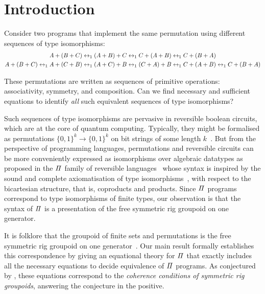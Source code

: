 \section{Introduction}
\label{sec:introduction}

Consider two programs that implement the same permutation using different sequences of type isomorphisms:
\begin{align*}
      A + (B + C) \leftrightarrow_1
      (A + B) + C & \leftrightarrow_1
      C + (A + B) \leftrightarrow_1
      C + (B + A)
      \\
      A + (B + C) \leftrightarrow_1
      A + (C + B) \leftrightarrow_1
      (A + C) + B & \leftrightarrow_1
      (C + A) + B \leftrightarrow_1
      C + (A + B) \leftrightarrow_1
      C + (B + A)
\end{align*}

\noindent These permutations are written as sequences of primitive operations: associativity, symmetry, and
composition. Can we find necessary and sufficient equations to identify \emph{all} such equivalent sequences of type
isomorphisms?

Such sequences of type isomorphisms are pervasive in reversible boolean circuits, which are at the core of quantum
computing. Typically, they might be formalised as permutations $\{0,1\}^k \to \{0,1\}^k$ on bit strings of some length
$k$~\cite{aaronson_et_al:LIPIcs:2017:8173,1201583}. But from the perspective of programming languages, permutations and
reversible circuits can be more conveniently expressed as isomorphisms over algebraic datatypes as proposed in the
$\mathit{\Pi}$ family of reversible languages~\cite*{jamesInformationEffects2012,theseus} whose syntax is inspired by the
sound and complete axiomatisation of type isomorphisms~\cite{fioreRemarksIsomorphismsTyped2002}, with respect to the
bicartesian structure, that is, coproducts and products. Since $\mathit{\Pi}$ programs correspond to type isomorphisms of
finite types, our observation is that the syntax of $\mathit{\Pi}$ is a presentation of the free symmetric rig groupoid on
one generator.

It is folklore that the groupoid of finite sets and permutations is the free symmetric rig groupoid on one
generator~\cite{laplaza72,kelly74,baez2000finite}. Our main result formally establishes this correspondence by giving an
equational theory for $\mathit{\Pi}$ that exactly includes all the necessary equations to decide equivalence of $\mathit{\Pi}$
programs. As conjectured by \citet{caretteComputingSemiringsWeak2016}, these equations correspond to the \emph{coherence
  conditions of symmetric rig groupoids}, answering the conjecture in the positive.

